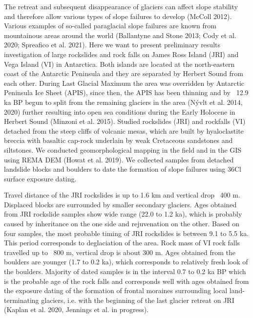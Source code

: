 {The retreat and subsequent disappearance of glaciers can affect slope stability and therefore allow various types of slope failures to develop (McColl 2012). Various examples of so-called paraglacial slope failures are known from mountainous areas around the world (Ballantyne and Stone 2013; Cody et al. 2020; Spreafico et al. 2021). Here we want to present preliminary results investigation of large rockslides and rock falls on James Ross Island (JRI) and Vega Island (VI) in Antarctica. Both islands are located at the north-eastern coast of the Antarctic Peninsula and they are separated by Herbert Sound from each other. During Last Glacial Maximum the area was overridden by Antarctic Peninsula Ice Sheet (APIS), since then, the APIS has been thinning and by ~12.9 ka BP begun to split from the remaining glaciers in the area (Nývlt et al. 2014, 2020) further resulting into open sea conditions during the Early Holocene in Herbert Sound (Minzoni et al. 2015). Studied rockslides (JRI) and rockfalls (VI) detached from the steep cliffs of volcanic mesas, which are built by hyaloclastite breccia with basaltic cap-rock underlain by weak Cretaceous sandstones and siltstones. We conducted geomorphological mapping in the field and in the GIS using REMA DEM (Howat et al. 2019). We collected samples from detached landslide blocks and boulders to date the formation of slope failures using 36Cl surface exposure dating. 
		
Travel distance of the JRI rockslides is up to 1.6 km and vertical drop ~400 m. Displaced blocks are surrounded by smaller secondary glaciers. Ages obtained from JRI rockslide samples show wide range (22.0 to 1.2 ka), which is probably caused by inheritance on the one side and rejuvenation on the other. Based on four samples, the most probable timing of JRI rockslides is between 9.1 to 5.5 ka. This period corresponds to deglaciation of the area. Rock mass of VI rock falls travelled up to ~800 m, vertical drop is about 300 m. Ages obtained from the boulders are younger (1.7 to 0.2 ka), which corresponds to relatively fresh look of the boulders. Majority of dated samples is in the interval 0.7 to 0.2 ka BP which is the probable age of the rock falls and corresponds well with ages obtained from the exposure dating of the formation of frontal moraines surrounding local land-terminating glaciers, i.e. with the beginning of the last glacier retreat on JRI (Kaplan et al. 2020, Jennings et al. in progress). 
	
}
